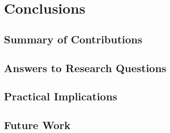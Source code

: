 \chapter{Conclusions}
\label{chap:conclusions}

\section{Summary of Contributions}
\label{sec:concl-summary}


\section{Answers to Research Questions}
\label{sec:concl-rq-answers}


\section{Practical Implications}
\label{sec:concl-implications}


\section{Future Work}
\label{sec:concl-future}

